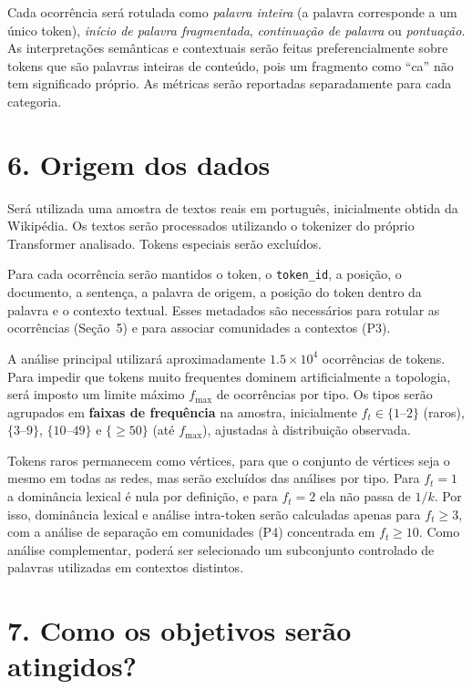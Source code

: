 \documentclass[11pt,a4paper]{article}
\begin{document}
Cada ocorrência será rotulada como \textit{palavra inteira} (a palavra
corresponde a um único token), \textit{início de palavra fragmentada},
\textit{continuação de palavra} ou \textit{pontuação}. As interpretações
semânticas e contextuais serão feitas preferencialmente sobre tokens que são
palavras inteiras de conteúdo, pois um fragmento como ``ca'' não tem
significado próprio. As métricas serão reportadas separadamente para cada
categoria.

\section*{6. Origem dos dados}

Será utilizada uma amostra de textos reais em português, inicialmente obtida da
Wikipédia. Os textos serão processados utilizando o tokenizer do
próprio Transformer analisado. Tokens especiais serão excluídos.

Para cada ocorrência serão mantidos o token, o \texttt{token\_id}, a posição,
o documento, a sentença, a palavra de origem, a posição do token dentro da
palavra e o contexto textual. Esses metadados são necessários para rotular as
ocorrências (Seção~5) e para associar comunidades a contextos (P3).

A análise principal utilizará aproximadamente $1.5\times10^4$ ocorrências de
tokens. Para impedir que tokens muito frequentes dominem artificialmente a
topologia, será imposto um limite máximo $f_{\max}$ de ocorrências por tipo.
Os tipos serão agrupados em \textbf{faixas de frequência} na amostra,
inicialmente $f_t \in \{1\text{--}2\}$ (raros), $\{3\text{--}9\}$,
$\{10\text{--}49\}$ e $\{\ge 50\}$ (até $f_{\max}$), ajustadas à distribuição
observada.

Tokens raros permanecem como vértices, para que o conjunto de vértices seja o
mesmo em todas as redes, mas serão excluídos das análises por tipo. Para
$f_t=1$ a dominância lexical é nula por definição, e para $f_t=2$ ela não
passa de $1/k$. Por isso, dominância lexical e análise intra-token serão
calculadas apenas para $f_t\ge 3$, com a análise de separação em comunidades
(P4) concentrada em $f_t\ge 10$. Como análise complementar, poderá ser
selecionado um subconjunto controlado de palavras utilizadas em contextos
distintos.

\section*{7. Como os objetivos serão atingidos?}
\end{document}
